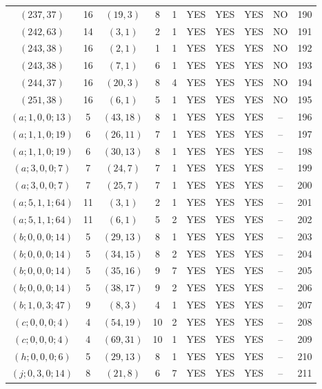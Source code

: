\begin{longtable}{|c|c|c|c|c|c|c|c|c|c|}
$(237, 37)$ & 16 & $(19, 3)$ & 8 & 1 & YES & YES & YES & NO & 190\\
$(242, 63)$ & 14 & $(3, 1)$ & 2 & 1 & YES & YES & YES & NO & 191\\
$(243, 38)$ & 16 & $(2, 1)$ & 1 & 1 & YES & YES & YES & NO & 192\\
$(243, 38)$ & 16 & $(7, 1)$ & 6 & 1 & YES & YES & YES & NO & 193\\
$(244, 37)$ & 16 & $(20, 3)$ & 8 & 4 & YES & YES & YES & NO & 194\\
$(251, 38)$ & 16 & $(6, 1)$ & 5 & 1 & YES & YES & YES & NO & 195\\
$(a; 1, 0, 0; 13)$ & 5 & $(43, 18)$ & 8 & 1 & YES & YES & YES & -- & 196\\
$(a; 1, 1, 0; 19)$ & 6 & $(26, 11)$ & 7 & 1 & YES & YES & YES & -- & 197\\
$(a; 1, 1, 0; 19)$ & 6 & $(30, 13)$ & 8 & 1 & YES & YES & YES & -- & 198\\
$(a; 3, 0, 0; 7)$ & 7 & $(24, 7)$ & 7 & 1 & YES & YES & YES & -- & 199\\
$(a; 3, 0, 0; 7)$ & 7 & $(25, 7)$ & 7 & 1 & YES & YES & YES & -- & 200\\
$(a; 5, 1, 1; 64)$ & 11 & $(3, 1)$ & 2 & 1 & YES & YES & YES & -- & 201\\
$(a; 5, 1, 1; 64)$ & 11 & $(6, 1)$ & 5 & 2 & YES & YES & YES & -- & 202\\
$(b; 0, 0, 0; 14)$ & 5 & $(29, 13)$ & 8 & 1 & YES & YES & YES & -- & 203\\
$(b; 0, 0, 0; 14)$ & 5 & $(34, 15)$ & 8 & 2 & YES & YES & YES & -- & 204\\
$(b; 0, 0, 0; 14)$ & 5 & $(35, 16)$ & 9 & 7 & YES & YES & YES & -- & 205\\
$(b; 0, 0, 0; 14)$ & 5 & $(38, 17)$ & 9 & 2 & YES & YES & YES & -- & 206\\
$(b; 1, 0, 3; 47)$ & 9 & $(8, 3)$ & 4 & 1 & YES & YES & YES & -- & 207\\
$(c; 0, 0, 0; 4)$ & 4 & $(54, 19)$ & 10 & 2 & YES & YES & YES & -- & 208\\
$(c; 0, 0, 0; 4)$ & 4 & $(69, 31)$ & 10 & 1 & YES & YES & YES & -- & 209\\
$(h; 0, 0, 0; 6)$ & 5 & $(29, 13)$ & 8 & 1 & YES & YES & YES & -- & 210\\
$(j; 0, 3, 0; 14)$ & 8 & $(21, 8)$ & 6 & 7 & YES & YES & YES & -- & 211
\end{longtable}
